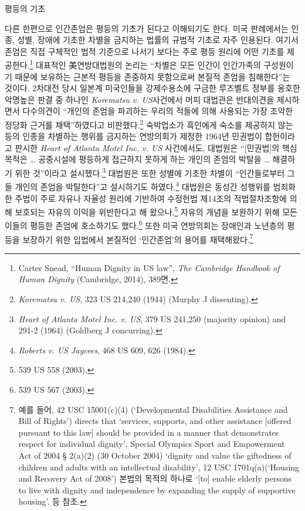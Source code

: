 평등의 기초

다른 한편으로 인간존엄은 평등의 기초가 된다고 이해되기도 한다. 미국 판례에서는 인종, 성별, 장애에 기초한 차별을 금지하는 법률의 규범적 기초로 자주 인용된다. 여기서 존엄은 직접 구체적인 법적 기준으로 나서기 보다는 주로 평등 원리에 어떤 기초를 제공한다.\footnote{Carter Snead, ``Human Dignity in US law'', \emph{The Cambridge Handbook of Human Dignity} (Cambridge, 2014), 389면.} 대표적인 美연방대법원의 논리는 ``차별은 모든 인간이 인간가족의 구성원이기 때문에 보유하는 근본적 평등을 존중하지 못함으로써 본질적 존엄을 침해한다''는 것이다. 2차대전 당시 일본계 미국인들을 강제수용소에 구금한 루즈벨트 정부를 옹호한 악명높은 판결 중 하나인 \emph{Korematsu v. US}사건에서 머피 대법관은 반대의견을 제시하면서 다수의견이 ``개인의 존엄을 파괴하는 우리의 적들에 의해 사용되는 가장 조악한 정당화 근거를 채택''하였다고 비판했다.\footnote{\emph{Korematsu v. US}, 323 US 214,240 (1944) (Murphy J dissenting).} 숙박업소가 흑인에게 숙소를 제공하지 않는 등의 인종을 차별하는 행위를 금지하는 연방의회가 제정한 1964년 민권법이 합헌이라고 판시한 \emph{Heart of Atlanta Motel Inc. v. US} 사건에서도, 대법원은 ``{[}민권법{]}의 핵심 목적은 \ldots{} 공중시설에 평등하게 접근하지 못하게 하는 개인의 존엄의 박탈을 \ldots{} 해결하기 위한 것''이라고 설시했다.\footnote{\emph{Heart of Atlanta Motel Inc. v. US}, 379 US 241,250 (majority opinion) and 291-2 (1964) (Goldberg J concurring).} 대법원은 또한 성별에 기초한 차별이 ``인간들로부터 그들 개인의 존엄을 박탈한다''고 설시하기도 하였다.\footnote{\emph{Roberts v. US Jaycees}, 468 US 609, 626 (1984).} 대법원은 동성간 성행위를 범죄화한 주법이 주로 자유나 자율성 원리에 기반하여 수정헌법 제14조의 적법절차조항에 의해 보호되는 자유의 이익을 위반한다고 해 왔으나,\footnote{539 US 558 (2003).} 자유의 개념을 보완하기 위해 모든 이들의 평등한 존엄에 호소하기도 했다.\footnote{539 US 567 (2003).} 또한 미국 연방의회는 장애인과 노년층의 평등을 보장하기 위한 입법에서 본질적인 `인간존엄'의 용어를 채택해왔다.\footnote{예를 들어, 42 USC 15001(c)(4) (`Developmental Disabilities Assistance and Bill of Rights') directs that `services, supports, and other assistance {[}offered pursuant to this law{]} should be provided in a manner that demonstrates respect for individual dignity', Special Olympics Sport and Empowerment Act of 2004 § 2(a)(2) (30 October 2004) `dignity and value the giftedness of children and adults with an intellectual disability', 12 USC 1701q(a)(`Housing and Recovery Act of 2008') 본법의 목적의 하나로 `{[}to{]} enable elderly persons to live with dignity and independence by expanding the supply of supportive housing'. 등 참조.}

